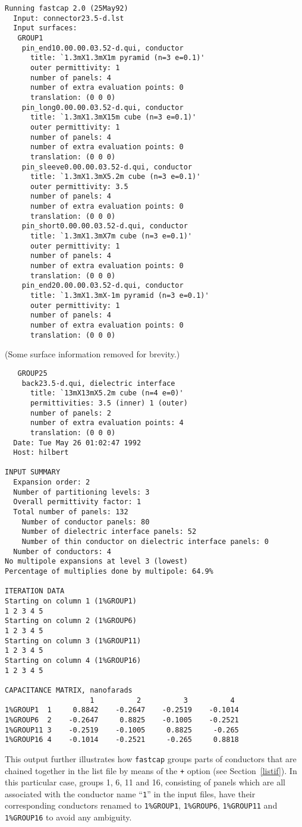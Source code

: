 \begin{verbatim}
Running fastcap 2.0 (25May92)
  Input: connector23.5-d.lst
  Input surfaces:
   GROUP1
    pin_end10.00.00.03.52-d.qui, conductor
      title: `1.3mX1.3mX1m pyramid (n=3 e=0.1)'
      outer permittivity: 1
      number of panels: 4
      number of extra evaluation points: 0
      translation: (0 0 0)
    pin_long0.00.00.03.52-d.qui, conductor
      title: `1.3mX1.3mX15m cube (n=3 e=0.1)'
      outer permittivity: 1
      number of panels: 4
      number of extra evaluation points: 0
      translation: (0 0 0)
    pin_sleeve0.00.00.03.52-d.qui, conductor
      title: `1.3mX1.3mX5.2m cube (n=3 e=0.1)'
      outer permittivity: 3.5
      number of panels: 4
      number of extra evaluation points: 0
      translation: (0 0 0)
    pin_short0.00.00.03.52-d.qui, conductor
      title: `1.3mX1.3mX7m cube (n=3 e=0.1)'
      outer permittivity: 1
      number of panels: 4
      number of extra evaluation points: 0
      translation: (0 0 0)
    pin_end20.00.00.03.52-d.qui, conductor
      title: `1.3mX1.3mX-1m pyramid (n=3 e=0.1)'
      outer permittivity: 1
      number of panels: 4
      number of extra evaluation points: 0
      translation: (0 0 0)
\end{verbatim}
\noindent (Some surface information removed for brevity.)
\begin{verbatim}
   GROUP25
    back23.5-d.qui, dielectric interface
      title: `13mX13mX5.2m cube (n=4 e=0)'
      permittivities: 3.5 (inner) 1 (outer)
      number of panels: 2
      number of extra evaluation points: 4
      translation: (0 0 0)
  Date: Tue May 26 01:02:47 1992
  Host: hilbert

INPUT SUMMARY
  Expansion order: 2
  Number of partitioning levels: 3
  Overall permittivity factor: 1
  Total number of panels: 132
    Number of conductor panels: 80
    Number of dielectric interface panels: 52
    Number of thin conductor on dielectric interface panels: 0
  Number of conductors: 4
No multipole expansions at level 3 (lowest)
Percentage of multiplies done by multipole: 64.9%

ITERATION DATA
Starting on column 1 (1%GROUP1)
1 2 3 4 5 
Starting on column 2 (1%GROUP6)
1 2 3 4 5 
Starting on column 3 (1%GROUP11)
1 2 3 4 5 
Starting on column 4 (1%GROUP16)
1 2 3 4 5 

CAPACITANCE MATRIX, nanofarads
                    1          2          3          4 
1%GROUP1  1     0.8842    -0.2647    -0.2519    -0.1014
1%GROUP6  2    -0.2647     0.8825    -0.1005    -0.2521
1%GROUP11 3    -0.2519    -0.1005     0.8825     -0.265
1%GROUP16 4    -0.1014    -0.2521     -0.265     0.8818
\end{verbatim}
This output further illustrates how {\tt fastcap} groups parts of conductors
that are chained together in the list file by means of the {\tt +}
option (see Section~\ref{listif}). In this particular case, groups
1, 6, 11 and 16, consisting of panels which are all associated with
the conductor name ``{\tt 1}''
in the input files, have their corresponding conductors renamed
to {\tt 1\%GROUP1}, {\tt 1\%GROUP6}, {\tt 1\%GROUP11} and
{\tt 1\%GROUP16} to avoid any ambiguity. 

